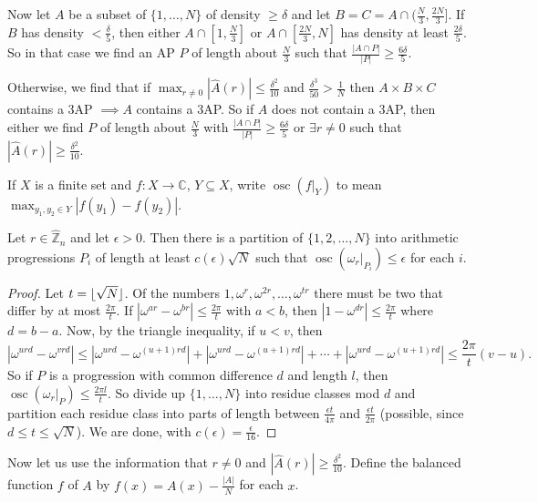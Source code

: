 \documentclass{article}
\newcommand{\1}[1]{\mathbbm{1}_{#1}}
\DeclarePairedDelimiter\floor{\lfloor}{\rfloor}
\DeclareMathOperator{\osc}{osc}
\begin{document}
Now let $A$ be a subset of $\{1, \dotsc, N\}$ of density $\geq \delta$ and let $B = C = A \cap (\frac{N}{3}, \frac{2N}{3}]$.
If $B$ has density $< \frac{\delta}{5}$, then either $A \cap [1, \frac{N}{3}]$ or $A \cap [\frac{2N}{3}, N]$ has density at least $\frac{2 \delta}{5}$.
So in that case we find an AP $P$ of length about $\frac{N}{3}$ such that $\frac{|A \cap P|}{|P|} \geq \frac{6 \delta}{5}$.

Otherwise, we find that if $\max_{r \neq 0} |\hat{A}(r)| \leq \frac{\delta^2}{10}$ and $\frac{\delta^3}{50} > \frac{1}{N}$ then $A \times B \times C$ contains a 3AP $\implies A$ contains a 3AP.
So if $A$ does not contain a 3AP, then either we find $P$ of length about $\frac{N}{3}$ with $\frac{|A \cap P|}{|P|} \geq \frac{6 \delta}{5}$ or $\exists r \neq 0$ such that $|\hat{A}(r)| \geq \frac{\delta^2}{10}$.

\begin{defi}
  If $X$ is a finite set and $f: X \to \mathbb{C}$, $Y \subseteq X$, write $\osc(f|_Y)$ to mean $\max_{y_1, y_2 \in Y} |f(y_1) - f(y_2)|$.
\end{defi}
\begin{nlemma}\label{lem:6}
  Let $r \in \hat{\mathbb{Z}}_n$ and let $\epsilon > 0$. Then there is a partition of $\{1,2,\dotsc,N\}$ into arithmetic progressions $P_i$ of length at least $c(\epsilon) \sqrt{N}$ such that $\osc(\omega_r|_{P_i}) \leq \epsilon$ for each $i$.
\end{nlemma}
\begin{proof}
  Let $t = \floor{\sqrt{N}}$. Of the numbers $1, \omega^r, \omega^{2r}, \dotsc, \omega^{tr}$ there must be two that differ by at most $\frac{2\pi}{t}$.
  If $|\omega^{ar} - \omega^{br}| \leq \frac{2\pi}{t}$ with $a < b$, then $|1 - \omega^{dr}| \leq \frac{2\pi}{t}$ where $d = b-a$.
  Now, by the triangle inequality, if $u < v$, then
  \begin{equation*}
    |\omega^{u rd} - \omega^{v r d}| \leq |\omega^{urd} - \omega^{(u+1) r d}| + |\omega^{urd} - \omega^{(u+1) r d}| + \dotsb + |\omega^{urd} - \omega^{(u+1) r d}| \leq \frac{2\pi}{t} (v-u).
  \end{equation*}
  So if $P$ is a progression with common difference $d$ and length $l$, then $\osc(\omega_r|_P) \leq \frac{2\pi l}{t}$.
  So divide up $\{1,\dotsc,N\}$ into residue classes mod $d$ and partition each residue class into parts of length between $\frac{\epsilon t}{4 \pi}$ and $\frac{\epsilon t}{2 \pi}$ (possible, since $d \leq t \leq \sqrt{N}$).
  We are done, with $c(\epsilon) = \frac{\epsilon}{16}$.
\end{proof}
Now let us use the information that $r \neq 0$ and $|\hat{A}(r)| \geq \frac{\delta^2}{10}$.
Define the balanced function $f$ of $A$ by $f(x) = A(x) - \frac{|A|}{N}$ for each $x$.
\end{document}
